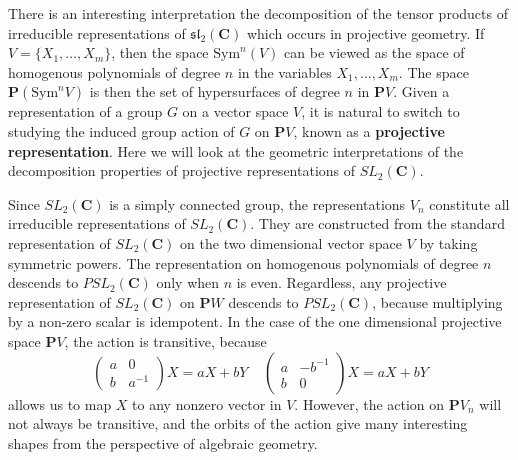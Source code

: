 There is an interesting interpretation the decomposition of the tensor products of irreducible representations of $\mathfrak{sl}_2(\mathbf{C})$ which occurs in projective geometry. If $V = \{ X_1, \dots, X_m \}$, then the space $\text{Sym}^n(V)$ can be viewed as the space of homogenous polynomials of degree $n$ in the variables $X_1, \dots, X_m$. The space $\mathbf{P}(\text{Sym}^n V)$ is then the set of hypersurfaces of degree $n$ in $\mathbf{P}V$. Given a representation of a group $G$ on a vector space $V$, it is natural to switch to studying the induced group action of $G$ on $\mathbf{P}V$, known as a {\bf projective representation}. Here we will look at the geometric interpretations of the decomposition properties of projective representations of $SL_2(\mathbf{C})$.

Since $SL_2(\mathbf{C})$ is a simply connected group, the representations $V_n$ constitute all irreducible representations of $SL_2(\mathbf{C})$. They are constructed from the standard representation of $SL_2(\mathbf{C})$ on the two dimensional vector space $V$ by taking symmetric powers. The representation on homogenous polynomials of degree $n$ descends to $PSL_2(\mathbf{C})$ only when $n$ is even. Regardless, any projective representation of $SL_2(\mathbf{C})$ on $\mathbf{P}W$ descends to $PSL_2(\mathbf{C})$, because multiplying by a non-zero scalar is idempotent. In the case of the one dimensional projective space $\mathbf{P} V$, the action is transitive, because
%
\[ \begin{pmatrix} a & 0 \\ b & a^{-1} \end{pmatrix} X = aX + bY \ \ \ \ \ \begin{pmatrix} a & -b^{-1} \\ b & 0 \end{pmatrix}X = aX + bY \]
%
allows us to map $X$ to any nonzero vector in $V$. However, the action on $\mathbf{P} V_n$ will not always be transitive, and the orbits of the action give many interesting shapes from the perspective of algebraic geometry.

